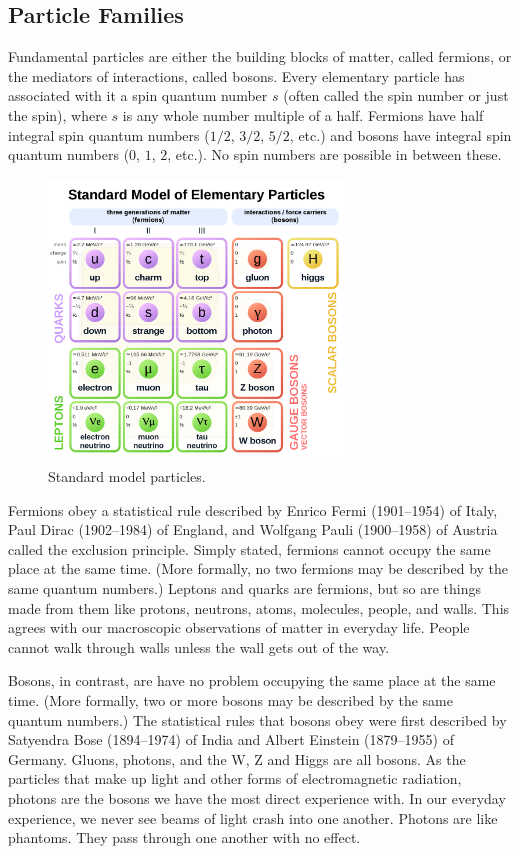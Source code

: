 \subsection{Particle Families}

Fundamental particles are either the building blocks of matter, called fermions, or the mediators of interactions, called bosons. Every elementary particle has associated with it a spin quantum number $s$ (often called the spin number or just the spin), where $s$ is any whole number multiple of a half. Fermions have half integral spin quantum numbers ($1/2$, $3/2$, $5/2$, etc.) and bosons have integral spin quantum numbers ($0$, $1$, $2$, etc.). No spin numbers are possible in between these. 

\begin{figure}
    \centering
    \includegraphics[width=0.7\textwidth]{tex/Chapters/Standard_Model/Imagen/Model.png}
    \caption{Standard model particles.}
    \label{fig:estandard_model}
\end{figure}

Fermions obey a statistical rule described by Enrico Fermi (1901–1954) of Italy, Paul Dirac (1902–1984) of England, and Wolfgang Pauli (1900–1958) of Austria called the exclusion principle. Simply stated, fermions cannot occupy the same place at the same time. (More formally, no two fermions may be described by the same quantum numbers.) Leptons and quarks are fermions, but so are things made from them like protons, neutrons, atoms, molecules, people, and walls. This agrees with our macroscopic observations of matter in everyday life. People cannot walk through walls unless the wall gets out of the way.

Bosons, in contrast, are have no problem occupying the same place at the same time. (More formally, two or more bosons may be described by the same quantum numbers.) The statistical rules that bosons obey were first described by Satyendra Bose (1894–1974) of India and Albert Einstein (1879–1955) of Germany. Gluons, photons, and the W, Z and Higgs are all bosons. As the particles that make up light and other forms of electromagnetic radiation, photons are the bosons we have the most direct experience with. In our everyday experience, we never see beams of light crash into one another. Photons are like phantoms. They pass through one another with no effect.

